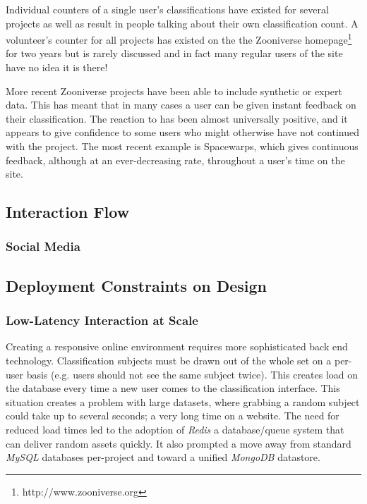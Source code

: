 \documentclass{sigchi}
\begin{document}
Individual counters of a single user's classifications have existed for several projects as well as result in people talking about their own classification count. A volunteer's counter for all projects has existed on the the Zooniverse homepage\footnote{http://www.zooniverse.org} for two years but is rarely discussed and in fact many regular users of the site have no idea it is there!

More recent Zooniverse projects have been able to include synthetic or expert data. This has meant that in many cases a user can be given instant feedback on their classification. The reaction to has been almost universally positive, and it appears to give confidence to some users who might otherwise have not continued with the project. The most recent example is Spacewarps, which gives continuous feedback, although at an ever-decreasing rate, throughout a user's time on the site.



\subsection{Interaction Flow}

\subsubsection{Social Media}

\subsection{Deployment Constraints on Design}

\subsubsection{Low-Latency Interaction at Scale}
Creating a responsive online environment requires more sophisticated back end technology. Classification subjects must be drawn out of the whole set on a per-user basis (e.g. users should not see the same subject twice). This creates load on the database every time a new user comes to the classification interface. This situation creates a problem with large datasets, where grabbing a random subject could take up to several seconds; a very long time on a website. The need for reduced load times led to the adoption of \emph{Redis} a database/queue system that can deliver random assets quickly. It also prompted a move away from standard \emph{MySQL} databases per-project and toward a unified \emph{MongoDB} datastore.
\end{document}
